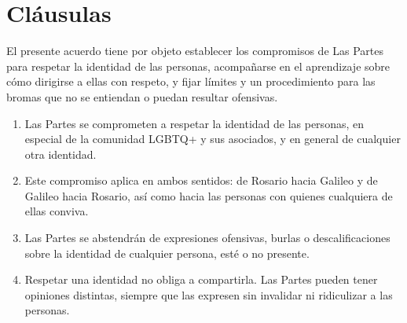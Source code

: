 
\section{Cláusulas}


El presente acuerdo tiene por objeto establecer los compromisos de Las Partes para respetar la identidad de las personas, acompañarse en el aprendizaje sobre cómo dirigirse a ellas con respeto, y fijar límites y un procedimiento para las bromas que no se entiendan o puedan resultar ofensivas.


\begin{enumerate}[label=\arabic*., leftmargin=*, itemsep=0.3em]
  \item Las Partes se comprometen a respetar la identidad de las personas, en especial de la comunidad LGBTQ+ y sus asociados, y en general de cualquier otra identidad.
  \item Este compromiso aplica en ambos sentidos: de Rosario hacia Galileo y de Galileo hacia Rosario, así como hacia las personas con quienes cualquiera de ellas conviva.
  \item Las Partes se abstendrán de expresiones ofensivas, burlas o descalificaciones sobre la identidad de cualquier persona, esté o no presente.
  \item Respetar una identidad no obliga a compartirla. Las Partes pueden tener opiniones distintas, siempre que las expresen sin invalidar ni ridiculizar a las personas.
\end{enumerate}


